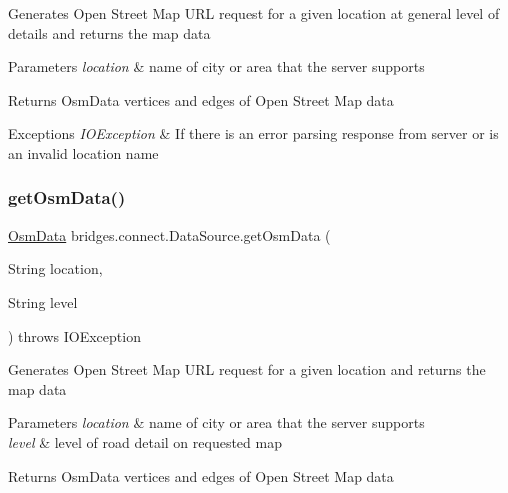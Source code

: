Generates Open Street Map U\+RL request for a given location at general level of details and returns the map data 
\begin{DoxyParams}{Parameters}
{\em location} & name of city or area that the server supports \\
\hline
\end{DoxyParams}
\begin{DoxyReturn}{Returns}
Osm\+Data vertices and edges of Open Street Map data 
\end{DoxyReturn}

\begin{DoxyExceptions}{Exceptions}
{\em I\+O\+Exception} & If there is an error parsing response from server or is an invalid location name \\
\hline
\end{DoxyExceptions}
\mbox{\label{classbridges_1_1connect_1_1_data_source_a2a1b73656312799046cd7bbf8bdebb0e}} 
\subsubsection{\texorpdfstring{get\+Osm\+Data()}{getOsmData()}\hspace{0.1cm}{\footnotesize\ttfamily [2/4]}}
{\footnotesize\ttfamily \hyperlink{classbridges_1_1data__src__dependent_1_1_osm_data}{Osm\+Data} bridges.\+connect.\+Data\+Source.\+get\+Osm\+Data (\begin{DoxyParamCaption}\item[{String}]{location,  }\item[{String}]{level }\end{DoxyParamCaption}) throws I\+O\+Exception}

Generates Open Street Map U\+RL request for a given location and returns the map data 
\begin{DoxyParams}{Parameters}
{\em location} & name of city or area that the server supports \\
\hline
{\em level} & level of road detail on requested map \\
\hline
\end{DoxyParams}
\begin{DoxyReturn}{Returns}
Osm\+Data vertices and edges of Open Street Map data 
\end{DoxyReturn}

